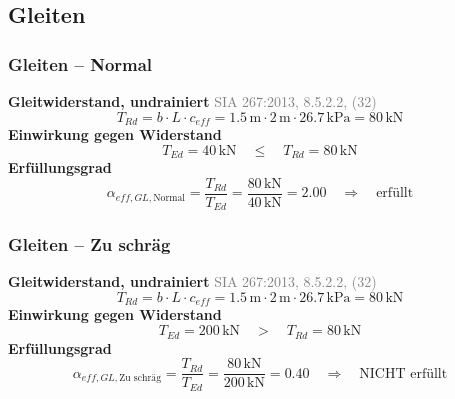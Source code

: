 \documentclass[11pt,a4paper]{article}
\newcommand{\normref}[1]{{\small\textcolor{gray}{#1}}}
\begin{document}
\subsection{Gleiten}
\subsubsection{Gleiten – Normal}
\noindent\textbf{Gleitwiderstand, undrainiert} \hfill \normref{SIA 267:2013, 8.5.2.2, (32)}
\begin{equation*}
T_{Rd} = b \cdot L \cdot c_{eff} = 1.5\,\mathrm{m} \cdot 2\,\mathrm{m} \cdot 26.7\,\mathrm{kPa} = 80\,\mathrm{kN}
\end{equation*}
\noindent\textbf{Einwirkung gegen Widerstand}
\begin{equation*}
T_{Ed} = 40\,\mathrm{kN} \quad \le \quad T_{Rd} = 80\,\mathrm{kN}
\end{equation*}
\noindent\textbf{Erfüllungsgrad}
\begin{equation*}
\alpha_{eff,GL,\text{Normal}} = \frac{T_{Rd}}{T_{Ed}} = \frac{80\,\mathrm{kN}}{40\,\mathrm{kN}} = 2.00 \quad \Rightarrow \quad \text{erfüllt}
\end{equation*}
\subsubsection{Gleiten – Zu schräg}
\noindent\textbf{Gleitwiderstand, undrainiert} \hfill \normref{SIA 267:2013, 8.5.2.2, (32)}
\begin{equation*}
T_{Rd} = b \cdot L \cdot c_{eff} = 1.5\,\mathrm{m} \cdot 2\,\mathrm{m} \cdot 26.7\,\mathrm{kPa} = 80\,\mathrm{kN}
\end{equation*}
\noindent\textbf{Einwirkung gegen Widerstand}
\begin{equation*}
T_{Ed} = 200\,\mathrm{kN} \quad > \quad T_{Rd} = 80\,\mathrm{kN}
\end{equation*}
\noindent\textbf{Erfüllungsgrad}
\begin{equation*}
\alpha_{eff,GL,\text{Zu schräg}} = \frac{T_{Rd}}{T_{Ed}} = \frac{80\,\mathrm{kN}}{200\,\mathrm{kN}} = 0.40 \quad \Rightarrow \quad \text{NICHT erfüllt}
\end{equation*}
\end{document}
